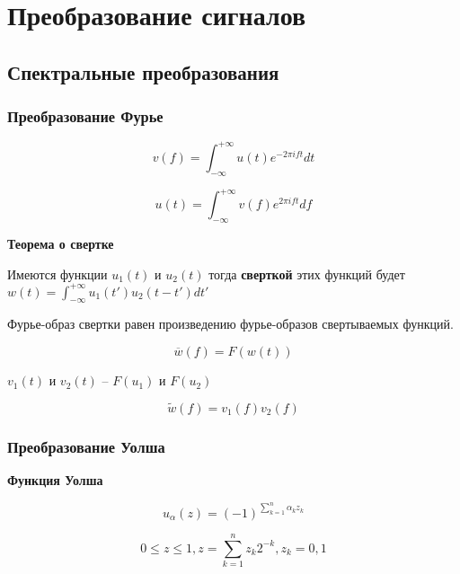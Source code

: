 \section{Преобразование сигналов}

\subsection{Спектральные преобразования}

\subsubsection{Преобразование Фурье}

\begin{equation*}
    v(f) = \int_{-\infty}^{+\infty} u(t) e^{-2\pi i f t} dt
\end{equation*}

\begin{equation*}
    u(t) = \int_{-\infty}^{+\infty} v(f) e^{2 \pi i f t} df
\end{equation*}

\textbf{Теорема о свертке}

Имеются функции $u_1(t)$ и $u_2(t)$ тогда \textbf{сверткой} этих функций будет $w(t) = \int_{-\infty}^{+\infty} u_1(t')u_2(t-t')dt'$

Фурье-образ свертки равен произведению фурье-образов свертываемых функций.

\begin{equation*}
    \overline{w}(f) = F(w(t))
\end{equation*}

$v_1(t)$ и $v_2(t)$ -- $F(u_1)$ и $F(u_2)$

\begin{equation*}
    \tilde w(f) = v_1(f) v_2(f)
\end{equation*}

\subsubsection{Преобразование Уолша}

\textbf{Функция Уолша}

\begin{equation*}
    u_{\alpha} (z) = (-1)^{\sum_{k=1}^{n} \alpha_k z_k}
\end{equation*}

\begin{equation*}
    0 \le z \le 1, z = \sum_{k=1}^n z_k 2^{-k}, z_k = 0,1
\end{equation*}

